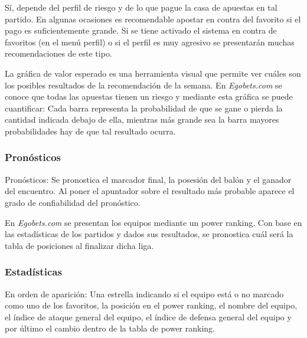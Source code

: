Sí, depende del perfil de riesgo y de lo que pague la casa de apuestas en tal partido. En algunas ocasiones es recomendable apostar en contra del favorito si el pago es suficientemente grande. Si se tiene activado el sistema en contra de favoritos (en el menú perfil) o si el perfil es muy agresivo se presentarán muchas recomendaciones de este tipo. 

La gráfica de valor esperado es una herramienta visual que permite ver cuáles son los posibles resultados de la recomendación de la semana. En \emph{Egobets.com} se conoce que todas las apuestas tienen un riesgo y mediante esta gráfica se puede cuantificar: Cada barra representa la probabilidad de que se gane o pierda la cantidad indicada debajo de ella, mientras más grande sea la barra mayores probabilidades hay de que tal resultado ocurra.



\subsubsection{Pronósticos}
Pronósticos: Se pronostica el marcador final, la posesión del balón y el ganador del encuentro. Al poner el apuntador sobre el resultado más probable aparece el grado de confiabilidad del pronóstico.


En \emph{Egobets.com} se presentan los equipos mediante un power ranking. Con base en las estadísticas de los partidos y dados sus resultados, se pronostica cuál será la tabla de posiciones al finalizar dicha liga.


\subsubsection{Estadísticas}


En orden de aparición: Una estrella indicando si el equipo está o no marcado como uno de los favoritos, la posición en el power ranking, el nombre del equipo, el índice de ataque general del equipo, el índice de defensa general del equipo y por último el cambio dentro de la tabla de power ranking. 


